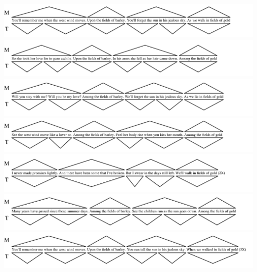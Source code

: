 \includegraphics[width=\textwidth]{resources/trees/fog-s1.png}
\includegraphics[width=\textwidth]{resources/trees/fog-s2.png}
\includegraphics[width=\textwidth]{resources/trees/fog-s3.png}
\includegraphics[width=\textwidth]{resources/trees/fog-s4.png}
\includegraphics[width=\textwidth]{resources/trees/fog-br.png}
\includegraphics[width=\textwidth]{resources/trees/fog-s5.png}
\includegraphics[width=\textwidth]{resources/trees/fog-s6.png}







